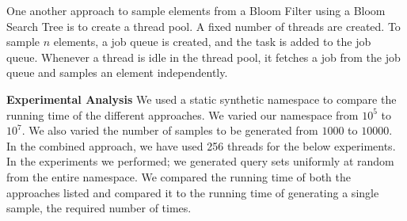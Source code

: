 \documentclass[a4paper]{article}
\begin{document}
One another approach to sample elements from a Bloom Filter using a Bloom Search Tree is to create a thread pool. A fixed number of threads are created. To sample $n$ elements, a job queue is created, and the task is added to the job queue. Whenever a thread is idle in the thread pool, it fetches a job from the job queue and samples an element independently.
\newline

\textbf{Experimental Analysis} 
We used a static synthetic namespace to compare the running time of the different approaches. We varied our namespace from $10^5$ to $10^7$. We also varied the number of samples to be generated from $1000$ to $10000$. In the combined approach, we have used 256 threads for the below experiments. In the experiments we performed; we generated query sets uniformly at random from the entire namespace. We compared the running time of both the approaches listed and compared it to the running time of generating a single sample, the required number of times. \newline
\end{document}

